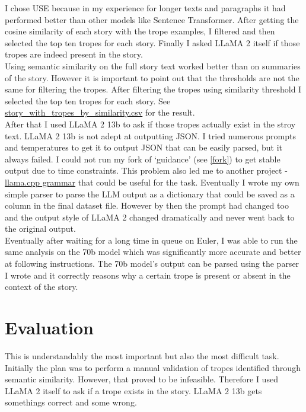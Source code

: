 \documentclass[11pt]{article}
\begin{document}
I chose USE because in my experience for longer texts and paragraphs it had performed better than other models like Sentence Transformer. After getting the cosine similarity of each story with the trope examples, I filtered and then selected the top ten tropes for each story. Finally I asked LLaMA 2 itself if those tropes are indeed present in the story.
\\
Using semantic similarity on the full story text worked better than on summaries of the story. However it is important to point out that the thresholds are not the same for filtering the tropes. 
After filtering the tropes using similarity threshold I selected the top ten tropes for each story. See \href{https://github.com/armsp/trama/blob/main/dataset/story_with_tropes_by_similarity.csv}{story\_with\_tropes\_by\_similarity.csv} for the result. 
\\
After that I used LLaMA 2 13b to ask if those tropes actually exist in the stroy text. LLaMA 2 13b is not adept at outputting JSON. I tried numerous prompts and temperatures to get it to output JSON that can be easily parsed, but it always failed. I could not run my fork of `guidance' (see \ref{fork}) to get stable output due to time constraints. This problem also led me to another project - \href{https://github.com/ggerganov/llama.cpp/tree/master/grammars}{llama.cpp grammar} that could be useful for the task. Eventually I wrote my own simple parser to parse the LLM output as a dictionary that could be saved as a column in the final dataset file. However by then the prompt had changed too and the output style of LLaMA 2 changed dramatically and never went back to the original output.\\
Eventually after waiting for a long time in queue on Euler, I was able to run the same analysis on the 70b model which was significantly more accurate and better at following instructions. The 70b model's output can be parsed using the parser I wrote and it correctly reasons why a certain trope is present or absent in the context of the story.

\section{Evaluation}
This is understandably the most important but also the most difficult task. Initially the plan was to perform a manual validation of tropes identified through semantic similarity. However, that proved to be infeasible. Therefore I used LLaMA 2 itself to ask if a trope exists in the story. LLaMA 2 13b gets somethings correct and some wrong.
\end{document}
